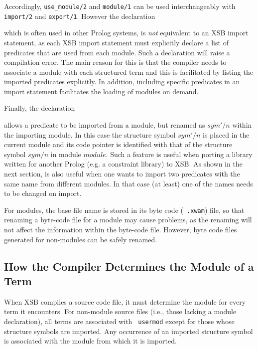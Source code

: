 
\noindent
Accordingly, {\tt use\_module/2} and {\tt module/1} can be used
interchangeably with {\tt import/2} and {\tt export/1}.  However the
declaration


\noindent
which is often used in other Prolog systems, is {\em not} equivalent
to an XSB import statement, as each XSB import statement must
explicitly declare a list of predicates that are used from each
module.  Such a declaration will raise a compilation error. The main
reason for this is that the compiler needs to associate a module with
each structured term and this is facilitated by listing the imported
predicates explicitly.  In addition, including specific predicates in
an import statement facilitates the loading of modules on demand.

Finally, the declaration 


\noindent
allows a predicate to be imported from a module, but renamed as
$sym'/n$ within the importing module.  In this case the structure
symbol $sym'/n$ is placed in the current module and its code pointer
is identified with that of the structure symbol $sym/n$ in module
$module$.  Such a feature is useful when porting a library written for
another Prolog (e.g. a constraint library) to XSB.  As shown in the
next section, is also useful when one wants to import two predicates
with the same name from different modules.  In that case (at least)
one of the names needs to be changed on import.

For modules, the base file name is stored in its byte code ({\tt
  .xwam}) file, so that renaming a byte-code file for a module may cause
problems, as the renaming will not affect the information within the
byte-code file.  However, byte code files generated for non-modules
can be safely renamed.

\subsection{How the Compiler Determines the Module of a Term}

When XSB compiles a source code file, it must determine the module for
every term it encounters.  For non-module source files (i.e., those
lacking a module declaration), all terms are associated with {\tt
  usermod} except for those whose structure symbols are imported.  Any
occurrence of an imported structure symbol is associated with the
module from which it is imported.

